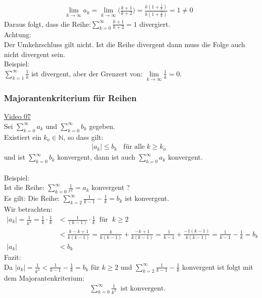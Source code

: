 \begin{align*}
\lim\limits_ {k\to\infty}a_k=\lim\limits_ {k\to\infty} \bigg(\frac{k+1}{k+2}\bigg)=\frac{k(1+\frac{1}{k})}{k(1+\frac{2}{k})}=1\neq 0
\end{align*}
Daraus folgt, dass die Reihe:$ \sum\limits_{k=0}^{\infty}\frac{k+1}{k+2}=1 $ divergiert.\\
Achtung:\\
Der Umkehrschluss gilt nicht. Ist die Reihe divergent dann muss die Folge auch nicht divergent sein.\\
Beispiel:\\
$ \sum\limits_{k=1}^{\infty}\frac{1}{k} $ ist divergent, aber der Grenzert von: $ \lim\limits_ {k\to\infty}\frac{1}{k}=0 $.\\
\subsubsection{Majorantenkriterium für Reihen}
\href{https://youtu.be/qShFeav_pYk}{Video 07}\\
Sei $ \sum\limits_{k=0}^{\infty}a_k $ und $ \sum\limits_{k=0}^{\infty}b_k $ gegeben.\\
Existiert ein $ k_o\in \mathbb{N} $, so dass gilt:\\
\begin{align*}
|a_k|\leq b_k\;\;\text{ für alle}\; k\geq k_o
\end{align*}
und ist $ \sum\limits_{k=0}^{\infty}b_k $ konvergent, dann ist auch $ \sum\limits_{k=0}^{\infty}a_k $ konvergent.\\
\\
Beispiel:\\
Ist die Reihe: $ \sum\limits_{k=0}^{\infty}\frac{1}{r^2}=a_k $ konvergent ?\\
Es gilt: Die Reihe: $ \sum\limits_{k=2}^{\infty}\frac{1}{k-1}-\frac{1}{k}=b_k $ ist konvergent.\\
Wir betrachten:\\
\begin{align*}
|a_k|=\frac{1}{k^2}=\frac{1}{k}\cdot\frac{1}{k}&<\frac{1}{(k-1)}\cdot\frac{1}{k}\;\;\text{für }\;k\geq 2\\
&<\frac{k-k+1}{k(k-1)}=\frac{k}{k(k-1)}+\frac{-k+1}{k(k-1)}=\frac{1}{k-1}+\frac{-1(k-1)}{k(k-1)}=\frac{1}{k-1}-\frac{1}{k}=b_k\\
|a_k|&<b_k
\end{align*}
Fazit:\\
Da $ |a_k|=\frac{1}{k^2}<\frac{1}{k-1}-\frac{1}{k}=b_k $ für $ k\geq2 $ und $ \sum\limits_{k=2}^{\infty}\frac{1}{k-1}-\frac{1}{k} $ konvergent ist folgt mit dem Majorantenkriterium:\\
\begin{align*}
\sum\limits_{k=0}^{\infty}\frac{1}{k^2}\;\;\text{ist konvergent. }\\
\end{align*}
